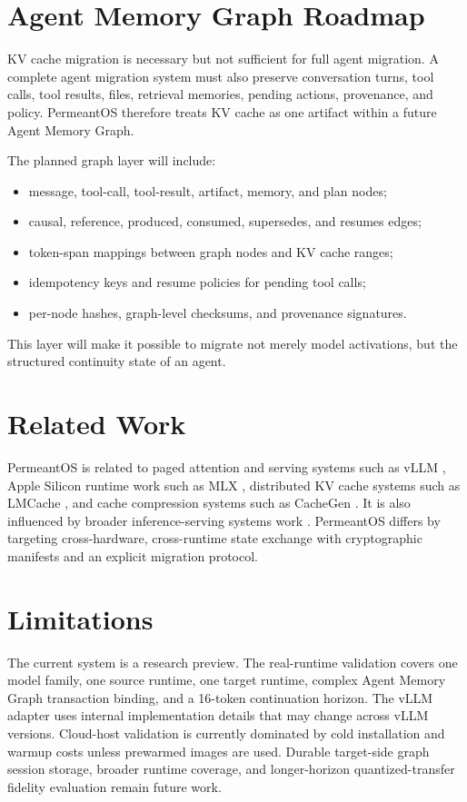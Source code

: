 \documentclass[11pt]{article}
\begin{document}
\section{Agent Memory Graph Roadmap}

KV cache migration is necessary but not sufficient for full agent migration. A complete agent migration system must also preserve conversation turns, tool calls, tool results, files, retrieval memories, pending actions, provenance, and policy. PermeantOS therefore treats KV cache as one artifact within a future Agent Memory Graph.

The planned graph layer will include:
\begin{itemize}[leftmargin=*]
  \item message, tool-call, tool-result, artifact, memory, and plan nodes;
  \item causal, reference, produced, consumed, supersedes, and resumes edges;
  \item token-span mappings between graph nodes and KV cache ranges;
  \item idempotency keys and resume policies for pending tool calls;
  \item per-node hashes, graph-level checksums, and provenance signatures.
\end{itemize}

This layer will make it possible to migrate not merely model activations, but the structured continuity state of an agent.

\section{Related Work}

PermeantOS is related to paged attention and serving systems such as vLLM \cite{kwon2023pagedattention,vllm2023}, Apple Silicon runtime work such as MLX \cite{mlx2023}, distributed KV cache systems such as LMCache \cite{lmcache2024}, and cache compression systems such as CacheGen \cite{liu2024cachegen}. It is also influenced by broader inference-serving systems work \cite{zheng2024lmsys}. PermeantOS differs by targeting cross-hardware, cross-runtime state exchange with cryptographic manifests and an explicit migration protocol.

\section{Limitations}

The current system is a research preview. The real-runtime validation covers one model family, one source runtime, one target runtime, complex Agent Memory Graph transaction binding, and a 16-token continuation horizon. The vLLM adapter uses internal implementation details that may change across vLLM versions. Cloud-host validation is currently dominated by cold installation and warmup costs unless prewarmed images are used. Durable target-side graph session storage, broader runtime coverage, and longer-horizon quantized-transfer fidelity evaluation remain future work.
\end{document}
